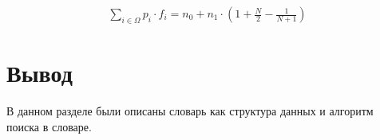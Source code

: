 \begin{equation}
	\label{for:brute}
	\begin{aligned}
		\sum\limits_{i \in \Omega} p_i \cdot f_i = n_0 + n_1 \cdot \left(1 + \frac{N}{2} - \frac{1}{N + 1}\right)
	\end{aligned}
\end{equation}

\section*{Вывод}
В данном разделе были описаны словарь как структура данных и алгоритм поиска в словаре.
